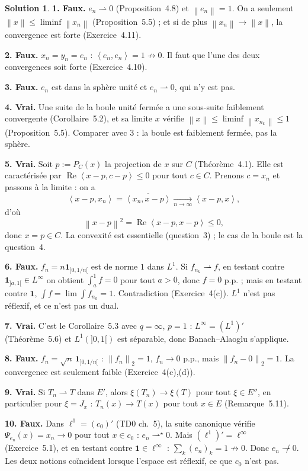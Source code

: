 \documentclass[11pt,a4paper]{article}
\newcommand{\norm}[1]{\left\|#1\right\|}
\newcommand{\ps}[2]{\left\langle #1,#2\right\rangle}
\newcommand{\wk}{\rightharpoonup}
\newcommand{\wks}{\rightharpoonup^{\!\star}}
\renewcommand{\Re}{\operatorname{Re}}
\theoremstyle{definition}
\newtheorem*{solution}{Solution}
\begin{document}
\begin{solution}
\noindent\textbf{1. Faux.} $e_n\wk0$ (Proposition~4.8) et $\norm{e_n}=1$. On a seulement $\norm x\le\liminf\norm{x_n}$ (Proposition~5.5) ; et si de plus $\norm{x_n}\to\norm x$, la convergence est forte (Exercice~4.11).

\medskip
\noindent\textbf{2. Faux.} $x_n=y_n=e_n$ : $\ps{e_n}{e_n}=1\not\to0$. Il faut que l'une des deux convergences soit forte (Exercice~4.10).

\medskip
\noindent\textbf{3. Faux.} $e_n$ est dans la sphère unité et $e_n\wk0$, qui n'y est pas.

\medskip
\noindent\textbf{4. Vrai.} Une suite de la boule unité fermée a une sous-suite faiblement convergente (Corollaire~5.2), et sa limite $x$ vérifie $\norm x\le\liminf\norm{x_{n_k}}\le1$ (Proposition~5.5). Comparer avec 3 : la boule est faiblement fermée, pas la sphère.

\medskip
\noindent\textbf{5. Vrai.} Soit $p:=P_C(x)$ la projection de $x$ sur $C$ (Théorème~4.1). Elle est caractérisée par $\Re\ps{x-p}{c-p}\le0$ pour tout $c\in C$. Prenons $c=x_n$ et passons à la limite : on a
\[
\ps{x-p}{x_n}=\overline{\ps{x_n}{x-p}}\xrightarrow[n\to\infty]{}\ps{x-p}x ,
\]
d'où
\[
\norm{x-p}^2=\Re\ps{x-p}{x-p}\le0,
\]
donc $x=p\in C$. La convexité est essentielle (question~3) ; le cas de la boule est la question~4.

\medskip
\noindent\textbf{6. Faux.} $f_n=n\mathbf 1_{]0,1/n[}$ est de norme $1$ dans $L^1$. Si $f_{n_k}\wk f$, en testant contre $\mathbf 1_{]a,1[}\in L^\infty$ on obtient $\int_a^1f=0$ pour tout $a>0$, donc $f=0$ p.p. ; mais en testant contre $\mathbf 1$, $\int f=\lim\int f_{n_k}=1$. Contradiction (Exercice~4(c)). $L^1$ n'est pas réflexif, et ce n'est pas un dual.

\medskip
\noindent\textbf{7. Vrai.} C'est le Corollaire~5.3 avec $q=\infty$, $p=1$ : $L^\infty=(L^1)'$ (Théorème~5.6) et $L^1(]0,1[)$ est séparable, donc Banach--Alaoglu s'applique.

\medskip
\noindent\textbf{8. Faux.} $f_n=\sqrt n\,\mathbf 1_{]0,1/n[}$ : $\norm{f_n}_2=1$, $f_n\to0$ p.p., mais $\norm{f_n-0}_2=1$. La convergence est seulement faible (Exercice~4(c),(d)).

\medskip
\noindent\textbf{9. Vrai.} Si $T_n\wk T$ dans $E'$, alors $\xi(T_n)\to\xi(T)$ pour tout $\xi\in E''$, en particulier pour $\xi=J_x$ : $T_n(x)\to T(x)$ pour tout $x\in E$ (Remarque~5.11).

\medskip
\noindent\textbf{10. Faux.} Dans $\ell^1=(c_0)'$ (TD0 ch.~5), la suite canonique vérifie $\Psi_{e_n}(x)=x_n\to0$ pour tout $x\in c_0$ : $e_n\wks0$. Mais $(\ell^1)'=\ell^\infty$ (Exercice~5.1), et en testant contre $\mathbf 1\in\ell^\infty$ : $\sum_k(e_n)_k=1\not\to0$. Donc $e_n\not\wk0$. Les deux notions coïncident lorsque l'espace est réflexif, ce que $c_0$ n'est pas.


\end{solution}
\end{document}
